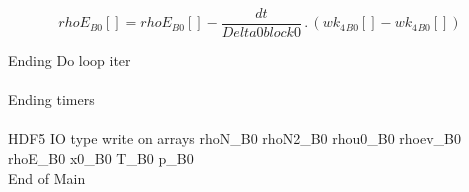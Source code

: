 \documentclass{article}
\begin{document}
\begin{dmath}{rhoE{_{B0}}}[{}] = {rhoE{_{B0}}}[{}] - \frac{dt}{Delta0block0} \,.\, \left({wk_{4}{_{B0}}}[{}] - {wk_{4}{_{B0}}}[{}]\right)\end{dmath}

\noindent Ending Do loop iter\\
\\\noindent Ending timers\\
\\\noindent HDF5 IO type write on arrays rhoN_B0 rhoN2_B0 rhou0_B0 rhoev_B0 rhoE_B0 x0_B0 T_B0 p_B0\\\noindent End of Main\\
\end{document}
